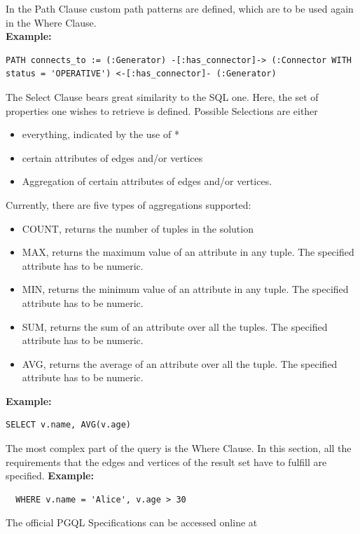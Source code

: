 \documentclass[11pt,singlecolumn]{scrartcl}
\begin{document}
In the Path Clause custom path patterns are defined, which are to be used again in the Where Clause.\\
\textbf{Example:}\\
\begin{lstlisting}
PATH connects_to := (:Generator) -[:has_connector]-> (:Connector WITH status = 'OPERATIVE') <-[:has_connector]- (:Generator)
 \end{lstlisting}
The Select Clause bears great similarity to the SQL one. Here, the set of properties one wishes to retrieve is defined. Possible Selections are either\\
\begin{itemize} 
\item everything, indicated by the use of * 
\item certain attributes of edges and/or vertices
\item Aggregation of certain attributes of edges and/or vertices.
\end{itemize}
 Currently, there are five types of aggregations supported:\\
 \begin{itemize} 
\item COUNT, returns the number of tuples in the solution 
\item MAX, returns the maximum value of an attribute in any tuple. The specified attribute has to be numeric.
\item MIN, returns the minimum value of an attribute in any tuple. The specified attribute has to be numeric.
\item SUM, returns the sum of an attribute over all the tuples. The specified attribute has to be numeric.
\item AVG, returns the average of an attribute over all the tuple. The specified attribute has to be numeric.
\end{itemize}
\textbf{Example:}\\
\begin{lstlisting}
SELECT v.name, AVG(v.age)
 \end{lstlisting} 
The most complex part of the query is the Where Clause. In this section, all the requirements that the edges and vertices of the result set have to fulfill are specified.
\textbf{Example:}\\
\begin{verbatim}
  WHERE v.name = 'Alice', v.age > 30
\end{verbatim}

The official PGQL Specifications can be accessed online at \cite{PGQLSpec}
\clearpage
\end{document}

